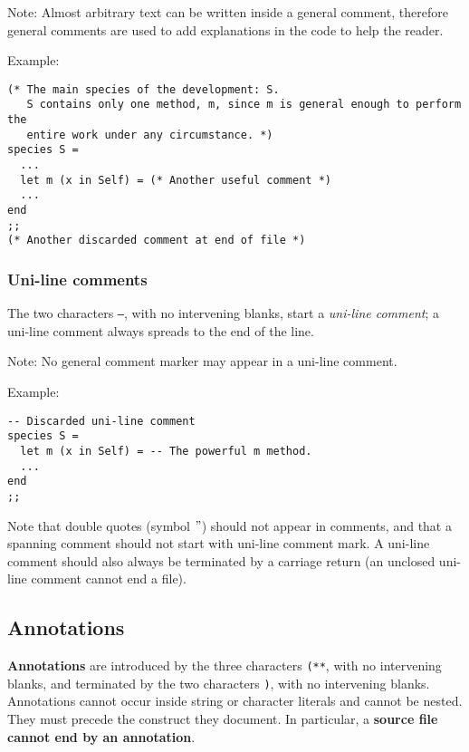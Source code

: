 Note: Almost arbitrary text can be written inside a general comment, therefore
general comments are used to add explanations in the code to help the reader.

Example:
{\scriptsize
\begin{lstlisting}
(* The main species of the development: S.
   S contains only one method, m, since m is general enough to perform the
   entire work under any circumstance. *)
species S =
  ...
  let m (x in Self) = (* Another useful comment *)
  ...
end
;;
(* Another discarded comment at end of file *)
\end{lstlisting}
}

\subsubsection{Uni-line comments}

The two characters {\tt --}, with no intervening blanks, start a {\em uni-line
comment}; a uni-line comment always spreads to the end of the line.

Note: No general comment marker may appear in a uni-line comment.

Example:
{\scriptsize
\begin{lstlisting}
-- Discarded uni-line comment
species S =
  let m (x in Self) = -- The powerful m method.
  ...
end
;;
\end{lstlisting}
}

Note that double quotes (symbol $"$) should not appear in comments, and that
a spanning comment should not start with uni-line comment mark. A uni-line
comment should also always be terminated by a carriage return (an unclosed
uni-line comment cannot end a file).

\subsection{Annotations}
\label{annotation}
{\bf Annotations} are introduced by the three characters {\tt (**},
with no intervening blanks, and terminated by the two characters
{\tt *)}, with no intervening blanks.
Annotations cannot occur inside string or character literals and
cannot be nested. They must precede the construct they document.
In particular, a {\bf source file cannot end by an annotation}.

